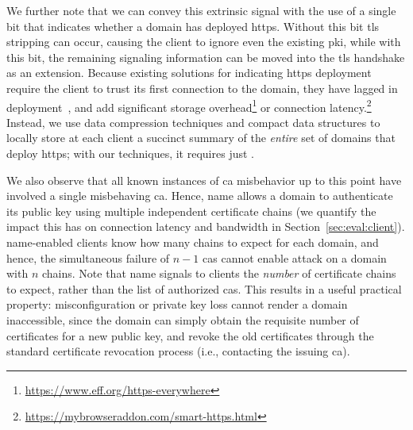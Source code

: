We further note that we can convey this extrinsic signal with the use of a
single bit that indicates whether a domain has deployed \ac{https}. Without this
bit \ac{tls} stripping can occur, causing the client to ignore even the existing
\ac{pki}, while with this bit, the remaining signaling information can be moved
into the \ac{tls} handshake as an extension. Because existing solutions for
indicating \ac{https} deployment require the client to trust its first
connection to the domain, they have lagged in deployment~\cite{rfc4033,
rfc6698}, and add significant storage
overhead\footnote{\url{https://www.eff.org/https-everywhere}} or connection
latency.\footnote{\url{https://mybrowseraddon.com/smart-https.html}} Instead, we
use data compression techniques and compact data structures to locally store at
each client a succinct summary of the \emph{entire} set of domains that deploy
\ac{https}; with our techniques, it requires just .

We also observe that all known instances of \ac{ca} misbehavior up to this point
have involved a single misbehaving \ac{ca}.  Hence, \ac{name} allows a domain to
authenticate its public key using multiple independent certificate chains (we
quantify the impact this has on connection latency and bandwidth in
Section~\ref{sec:eval:client}). \ac{name}-enabled clients know how many chains to expect
for each domain, and hence, the simultaneous failure of $n-1$ \acp{ca} cannot
enable  attack on a domain with $n$ chains. Note that \ac{name}
signals to clients the \emph{number} of certificate chains to expect, rather
than the list of authorized \acp{ca}.  This results in a useful practical
property: misconfiguration or private key loss cannot render a domain
inaccessible, since the domain can simply obtain the requisite number of
certificates for a new public key, and revoke the old certificates through the
standard certificate revocation process (i.e., contacting the issuing \ac{ca}).


